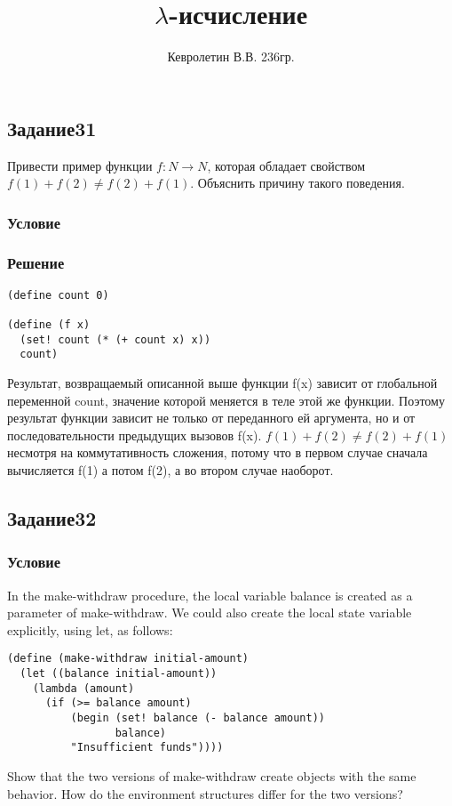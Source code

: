 \documentclass[10pt,a4paper]{article}
\author{Кевролетин В.В. 236гр.}
\title{$\lambda$-исчисление}
\begin{document}
\maketitle

\subsection*{Задание31}
Привести пример функции $f:N\rightarrow N$, которая обладает свойством
$f(1)+f(2)\not =f(2)+f(1)$. Объяснить причину такого поведения.
\subsubsection*{Условие}
\subsubsection*{Решение}
\begin{lstlisting}
(define count 0)

(define (f x)
  (set! count (* (+ count x) x))
  count)
\end{lstlisting}

Результат, возвращаемый описанной выше функции f(x) зависит от
глобальной переменной
count, значение которой меняется в теле этой же функции. Поэтому
результат функции зависит не только от переданного ей аргумента, но и
от
последовательности предыдущих вызовов f(x).
$f(1)+f(2)\not =f(2)+f(1)$ несмотря на коммутативность сложения,
потому что в первом случае сначала вычисляется f(1) а потом f(2), а во
втором случае наоборот.

\subsection*{Задание32}
\subsubsection*{Условие}
In the make-withdraw procedure, the local variable balance is created as a parameter of make-withdraw. We could also create the local state variable explicitly, using let, as follows:
\begin{lstlisting}
(define (make-withdraw initial-amount)
  (let ((balance initial-amount))
    (lambda (amount)
      (if (>= balance amount)
          (begin (set! balance (- balance amount))
                 balance)
          "Insufficient funds"))))
\end{lstlisting}
Show that the two versions of make-withdraw create objects with the same behavior. How do the environment structures differ for the two versions?
\end{document}
